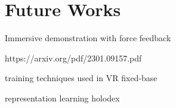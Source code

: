 \chapter{Future Works}

Immersive demonstration with force feedback 

https://arxiv.org/pdf/2301.09157.pdf

training techniques used in VR fixed-base

representation learning holodex
